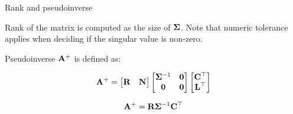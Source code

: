 \documentclass{beamer}
\begin{document}
\begin{frame}{Rank and pseudoinverse}
	\begin{flushleft}
		
		Rank of the matrix is computed as the size of $\mathbf{\Sigma}$. Note that numeric tolerance applies when deciding if the singular value is non-zero.
		
		\bigskip
		
		Pseudoinverse $\mathbf{A}^+$ is defined as:
		
\begin{equation}
	\mathbf{A}^+ = 
	\begin{bmatrix}
		\mathbf{R} & \mathbf{N}
	\end{bmatrix}
	\begin{bmatrix}
		\mathbf{\Sigma}^{-1} & \mathbf{0} \\
		\mathbf{0} & \mathbf{0}
	\end{bmatrix}
\begin{bmatrix}
	\mathbf{C}^\top \\ \mathbf{L}^\top
\end{bmatrix}
\end{equation}		
		
		\begin{equation}
			\mathbf{A}^+ = 
			\mathbf{R} \mathbf{\Sigma}^{-1} \mathbf{C}^\top
		\end{equation}		
		
	\end{flushleft}
\end{frame}
\end{document}
